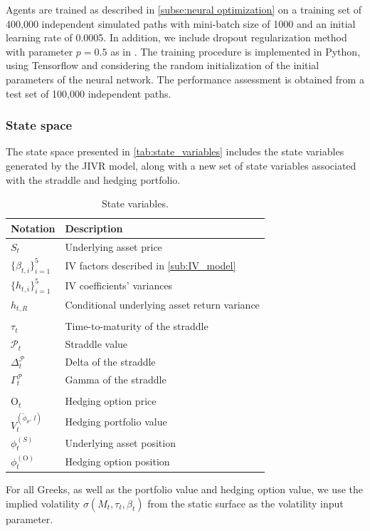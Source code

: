 \documentclass[12pt]{article}
\begin{document}
Agents are trained as described in \cref{subse:neural optimization} on a training set of 400,000 independent simulated paths with mini-batch size of 1000 and an initial learning rate of 0.0005.
In addition, we include dropout regularization method with parameter $p=0.5$ as in \cite{François2025}. The training procedure is implemented in Python, using Tensorflow and considering the \cite{glorot2010understanding} random initialization of the initial parameters of the neural network. The performance assessment is obtained from a test set of 100,000 independent paths. 

\subsubsection{State space}

The state space presented in \autoref{tab:state_variables} includes the state variables generated by the JIVR model, along with a new set of state variables associated with the straddle and hedging portfolio. 

\begin{table}[h]
    \centering
    \caption{State variables.}
    \begin{tabular}{>{\arraybackslash}m{2.5cm} >{\arraybackslash}m{8cm}}
        \toprule
        Notation & Description \\
        \midrule
        $S_{t}$ & Underlying asset price \\
        $\{\beta_{t,i} \}^5_{i=1}$ & IV factors described in \cref{sub:IV_model} \\
        $\{ h_{t,i}\}^5_{i=1}$ & IV coefficients' variances \\
        $h_{t,R}$ & Conditional underlying asset return variance \\
        &\\
        $\tau_{t}$ & Time-to-maturity of the straddle \\
        $\mathcal{P}_{t}$ & Straddle value \\
        $\Delta_{t}^{\mathcal{P}}$ & Delta of the straddle \\
        $\Gamma_{t}^{ \mathcal{P}}$ & Gamma of the straddle\\
        &\\
        $\text{O}_{t}$ & Hedging option price\\ 
        $V_{t}^{(\tilde{\phi}_{\theta},\, l)}$ & Hedging portfolio value \\
        $\phi_{t}^{(S)}$ & Underlying asset position \\
        $\phi^{(\text{O})}_{t}$ & Hedging option position \\
        \bottomrule
    \end{tabular}
    \label{tab:state_variables}
    \begin{tablenotes}
    \item \small For all Greeks, as well as the portfolio value and hedging option value, we use the implied volatility $\sigma (M_{t},\tau_{t},\beta_{t})$ from the static surface as the volatility input parameter.
    \end{tablenotes}
\end{table}
\end{document}
